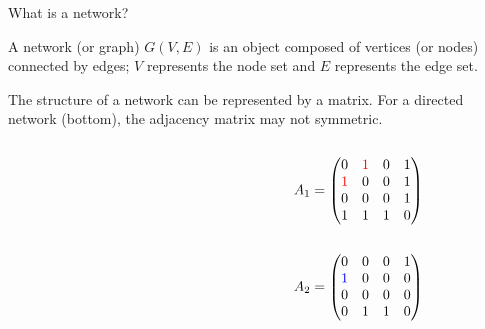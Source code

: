 \documentclass[xcolor=dvipsnames, compress, 10pt]{beamer}
\theoremstyle{remark}
\begin{document}
\begin{frame}{What is a network?}

A network (or graph) $G(V, E)$ is an object composed of vertices (or nodes)
connected by edges; $V$ represents the node set and $E$
represents the edge set.


The structure of a network can be represented by a matrix. 
For a directed network (bottom),
the adjacency matrix may not symmetric.

\vspace{0.5cm}

\begin{columns}
	\begin{column}{0.5\textwidth}
		\centering
		
	\end{column}
	\begin{column}{0.5\textwidth}
		\centering
		\begin{align*}
			A_1 = 
			\begin{pmatrix*}
			0 & \color{red} 1 & 0 & 1 \\
			\color{red} 1 & 0 & 0 & 1 \\
			0 & 0 & 0 & 1 \\
			1 & 1 & 1 & 0
			\end{pmatrix*}
		\end{align*}
	\end{column}
\end{columns}

\vfill

\begin{columns}
	\begin{column}{0.5\textwidth}
		\centering
		
	\end{column}
	\begin{column}{0.5\textwidth}
		\centering
		\begin{align*}
			A_2 = 
			\begin{pmatrix*}
				0 & 0 & 0 & 1 \\
				\color{blue}{1} & 0 & 0 & 0 \\
				0 & 0 & 0 & 0 \\
				0 & 1 & 1 & 0
			\end{pmatrix*}
		\end{align*}
	\end{column}
\end{columns}
	
\end{frame}

\end{document}
